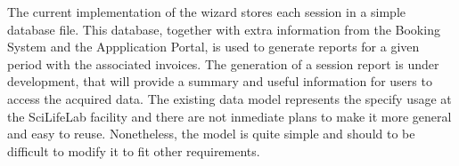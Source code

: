 The current implementation of the wizard stores each session in a simple database file. This database, together
with extra information from the Booking System and the Appplication Portal, is used to generate reports for 
a given period with the associated invoices. The generation of a session report is under development, that 
will provide a summary and useful information for users to access the acquired data. The existing data model 
represents the specify usage at the SciLifeLab facility and there are not inmediate plans to make it more 
general and easy to reuse. Nonetheless, the model is quite simple and should to be difficult to modify it to fit 
other requirements. 


